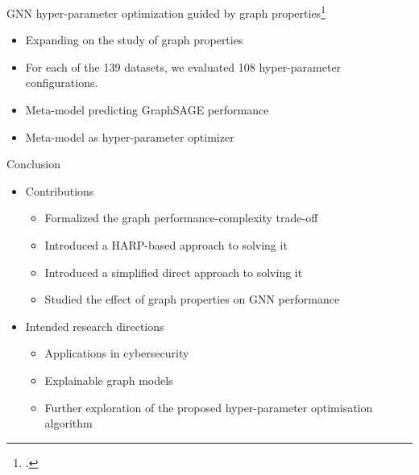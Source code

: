 \documentclass[10pt]{beamer}
\begin{document}
\begin{frame}{GNN hyper-parameter optimization guided by graph properties\footcite{prochazka_which_2023}}
	\begin{itemize}
		\item<1-> Expanding on the study of graph properties
		\item<1-> For each of the 139 datasets, we evaluated 108 hyper-parameter configurations.
		\item<2-> Meta-model predicting GraphSAGE performance
		\item<3-> Meta-model as hyper-parameter optimizer
	\end{itemize}

	\vfill

	\centering
\end{frame}

\begin{frame}{Conclusion}
	\begin{itemize}
		\item Contributions
		\begin{itemize}
			\item Formalized the graph performance-complexity trade-off
			\item Introduced a HARP-based approach to solving it
			\item Introduced a simplified direct approach to solving it
			\item Studied the effect of graph properties on GNN performance
		\end{itemize}
		\item Intended research directions
		\begin{itemize}
			\item Applications in cybersecurity
			\item Explainable graph models
			\item Further exploration of the proposed hyper-parameter optimisation algorithm
		\end{itemize}
	\end{itemize}
\end{frame}
\end{document}
